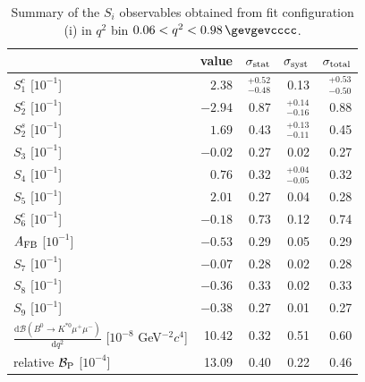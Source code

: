 \begin{table}\centering
\caption{Summary of the $S_{i}$ observables obtained from fit configuration (i) in $q^{2}$ bin \mbox{$0.06 < q^{2} < 0.98\,\gevgevcccc$}.}
\label{sec:fit_results:si_s1c:table:summary_bin0}
\begin{tabular}{lrrrr}
\toprule
 & value & $\sigma_{\rm stat}$ & $\sigma_{\rm syst}$ & $\sigma_{\rm total}$ \\
\midrule
$S_{1}^{c}$ [$ 10^{-1}$] & $2.38$ & $^{+0.52}_{-0.48}$ & 0.13 & $^{+0.53}_{-0.50}$ \\
$S_{2}^{c}$ [$ 10^{-1}$] & $-2.94$ & 0.87 & $^{+0.14}_{-0.16}$ & 0.88 \\
$S_{2}^{s}$ [$ 10^{-1}$] & $1.69$ & 0.43 & $^{+0.13}_{-0.11}$ & 0.45 \\
$S_{3}$ [$ 10^{-1}$] & $-0.02$ & 0.27 & 0.02 & 0.27 \\
$S_{4}$ [$ 10^{-1}$] & $0.76$ & 0.32 & $^{+0.04}_{-0.05}$ & 0.32 \\
$S_{5}$ [$ 10^{-1}$] & $2.01$ & 0.27 & 0.04 & 0.28 \\
$S_{6}^{c}$ [$ 10^{-1}$] & $-0.18$ & 0.73 & 0.12 & 0.74 \\
$A_{\rm FB}$ [$ 10^{-1}$] & $-0.53$ & 0.29 & 0.05 & 0.29 \\
$S_{7}$ [$ 10^{-1}$] & $-0.07$ & 0.28 & 0.02 & 0.28 \\
$S_{8}$ [$ 10^{-1}$] & $-0.36$ & 0.33 & 0.02 & 0.33 \\
$S_{9}$ [$ 10^{-1}$] & $-0.38$ & 0.27 & 0.01 & 0.27 \\
\midrule
$\frac{\mathrm{d}\mathcal{B}(B^{0}\to K^{\ast 0}\mu^{+}\mu^{-})}{\mathrm{d} q^{2}}$ [$ 10^{-8}$ GeV$^{-2}c^{4}$] & 10.42 & 0.32 & 0.51 & 0.60 \\
relative $\mathcal{B}_{\rm P}$ [$10^{-4}$] & 13.09 & 0.40 & 0.22 & 0.46 \\
\bottomrule
\end{tabular}
\end{table}
